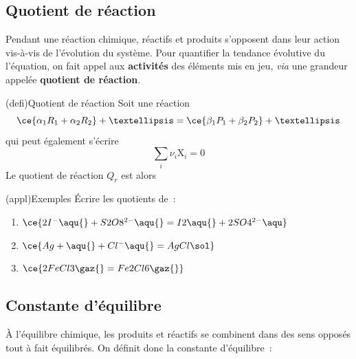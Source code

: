 \documentclass[../../main/main.tex]{subfiles}
\begin{document}
\subsection{Quotient de réaction}

Pendant une réaction chimique, réactifs et produits s'opposent dans leur action
vis-à-vis de l'évolution du système.
Pour quantifier la tendance évolutive du l'équation, on fait appel aux
\textbf{activités} des éléments mis en jeu, \textit{via} une grandeur appelée
\textbf{quotient de réaction}.

\begin{tcb}[label=quoreac](defi){Quotient de réaction}
	Soit une réaction
	\[\ce{\alpha_1R_1 + \alpha_2R_2} +…
		=
		\ce{\beta_1P_1 +\beta_2P_2}+…\]
	qui peut également s'écrire
	\[ \sum_i \nu_i\mathrm{X}_i = 0\]
	Le quotient de réaction $Q_r$ est alors
	\psw{
		\[
			\boxed{Q_r = \frac{a(\ce{P_1})^{\beta_1} \times
					a(\ce{P_2})^{\beta_2} \times…}{
					a(\ce{R_1})^{\alpha_1} \times
					a(\ce{R_2})^{\alpha_2} \times…}}
			\qou
			\boxed{Q_r = \prod_i a(\ce{X_i})^{\nu_i}}
		\]
	}
\end{tcb}

\begin{tcb}[label=exem:qr, sidebyside, righthand ratio=.45](appl){Exemples}
	Écrire les quotients de~:
	\begin{enumerate}
		\item $\ce{2I^-\aqu{} + S2O8^{2-}\aqu{} = I2\aqu{} +2SO4^{2-}\aqu}$
		\item $\ce{Ag+\aqu{} + Cl^-\aqu{} = AgCl\sol}$
		\item $\ce{2FeCl3\gaz{} = Fe2Cl6\gaz{}}$
	\end{enumerate}
	\tcblower
	\vspace{+15pt}
	\begin{enumerate}
		\mitem
		\psw{
			\[
				Q_r = \frac{
					[\ce{I2}]\times[\ce{SO4^{2-}}]^2
				}{
					[\ce{I-}]^2\times [\ce{S2O8^{2-}}]
				}
			\]
		}
		\mitem
		\psw{
			\[
				Q_r =
				\frac{c\degree^2
				}{
					[\ce{Ag+}]\times[\ce{Cl-}]
				}
			\]
		}
		\mitem
		\psw{
			\[
				Q_r = \frac{P_{\ce{Fe2Cl6}}/P\degree
				}{
					P_{\ce{FeCl3}}{}^2/P\degree{}^2}
				=
				P\degree\frac{P_{\ce{Fe2Cl6}}
				}{
					P_{\ce{FeCl3}}{}^2
				}
			\]
		}
	\end{enumerate}
	\vspace{-15pt}
\end{tcb}

\subsection{Constante d'équilibre}
À l'équilibre chimique, les produits et réactifs se combinent dans des sens
opposés tout à fait équilibrés. On définit donc la constante d'équilibre~:
\end{document}
